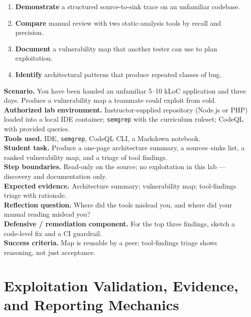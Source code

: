 \documentclass[11pt,letterpaper,oneside]{report}
\newcommand{\tool}[1]{\texttt{\small #1}}
\begin{document}
\begin{outcomes}
\begin{enumerate}
  \item \textbf{Demonstrate} a structured source-to-sink trace on an unfamiliar codebase.
  \item \textbf{Compare} manual review with two static-analysis tools by recall and precision.
  \item \textbf{Document} a vulnerability map that another tester can use to plan exploitation.
  \item \textbf{Identify} architectural patterns that produce repeated classes of bug.
\end{enumerate}
\end{outcomes}

\begin{labbox}
\textbf{Scenario.} You have been handed an unfamiliar 5--10 kLoC application and three days. Produce a vulnerability map a teammate could exploit from cold.\\[3pt]
\textbf{Authorized lab environment.} Instructor-supplied repository (Node.js or PHP) loaded into a local IDE container; \tool{semgrep} with the curriculum ruleset; CodeQL with provided queries.\\[3pt]
\textbf{Tools used.} IDE, \tool{semgrep}, CodeQL CLI, a Markdown notebook.\\[3pt]
\textbf{Student task.} Produce a one-page architecture summary, a sources--sinks list, a ranked vulnerability map, and a triage of tool findings.\\[3pt]
\textbf{Step boundaries.} Read-only on the source; no exploitation in this lab --- discovery and documentation only.\\[3pt]
\textbf{Expected evidence.} Architecture summary; vulnerability map; tool-findings triage with rationale.\\[3pt]
\textbf{Reflection question.} Where did the tools mislead you, and where did your manual reading mislead you?\\[3pt]
\textbf{Defensive / remediation component.} For the top three findings, sketch a code-level fix and a CI guardrail.\\[3pt]
\textbf{Success criteria.} Map is reusable by a peer; tool-findings triage shows reasoning, not just acceptance.
\end{labbox}

\chapter{Exploitation Validation, Evidence, and Reporting Mechanics}
\end{document}
